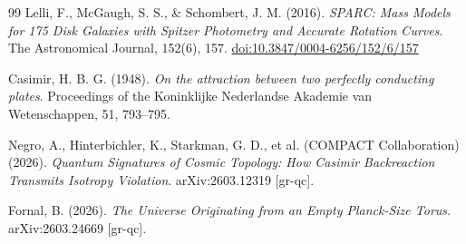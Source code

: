 \documentclass[aps,prd,11pt,onecolumn,superscriptaddress,nofootinbib,floatfix]{revtex4-2}
\begin{document}
\begin{thebibliography}{99}
Lelli, F., McGaugh, S. S., \& Schombert, J. M. (2016). \textit{SPARC: Mass Models for 175 Disk Galaxies with Spitzer Photometry and Accurate Rotation Curves}. The Astronomical Journal, 152(6), 157. \href{https://doi.org/10.3847/0004-6256/152/6/157}{doi:10.3847/0004-6256/152/6/157}

Casimir, H. B. G. (1948). \textit{On the attraction between two perfectly conducting plates}. Proceedings of the Koninklijke Nederlandse Akademie van Wetenschappen, 51, 793--795.

Negro, A., Hinterbichler, K., Starkman, G. D., et al. (COMPACT Collaboration) (2026). \textit{Quantum Signatures of Cosmic Topology: How Casimir Backreaction Transmits Isotropy Violation}. arXiv:2603.12319 [gr-qc].

Fornal, B. (2026). \textit{The Universe Originating from an Empty Planck-Size Torus}. arXiv:2603.24669 [gr-qc].

\end{thebibliography}
\end{document}
